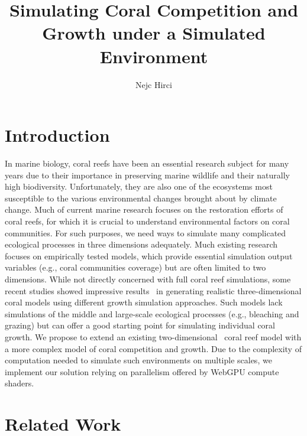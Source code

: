 \documentclass[9pt]{pnas-new}
\title{Simulating Coral Competition and Growth under a Simulated Environment}
\author{Nejc Hirci}
\affil{Collective behavior course research seminar report}
\newcommand{\eg}{e.g., }
\begin{document}
\verticaladjustment{-2pt}

\maketitle
\thispagestyle{firststyle}

\section*{Introduction}

In marine biology, coral reefs have been an essential research subject for many years due to their importance in preserving marine wildlife and their naturally high biodiversity. Unfortunately, they are also one of the ecosystems most susceptible to the various environmental changes brought about by climate change. Much of current marine research focuses on the restoration efforts of coral reefs, for which it is crucial to understand environmental factors on coral communities. For such purposes, we need ways to simulate many complicated ecological processes in three dimensions adequately. Much existing research focuses on empirically tested models, which provide essential simulation output variables (\eg coral communities coverage) but are often limited to two dimensions. While not directly concerned with full coral reef simulations, some recent studies showed impressive results~\cite{sponge_growth, inifinigen} in generating realistic three-dimensional coral models using different growth simulation approaches. Such models lack simulations of the middle and large-scale ecological processes (\eg bleaching and grazing) but can offer a good starting point for simulating individual coral growth. We propose to extend an existing two-dimensional~\cite{coral_community_main} coral reef model with a more complex model of coral competition and growth. Due to the complexity of computation needed to simulate such environments on multiple scales, we implement our solution relying on parallelism offered by WebGPU compute shaders. 

\section*{Related Work}
\end{document}

